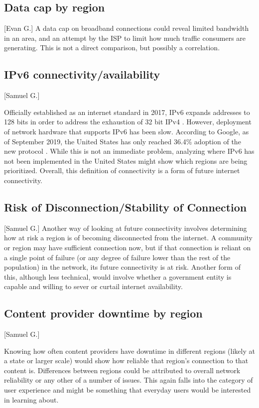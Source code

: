 \subsection{Data cap by region}[Evan G.]
A data cap on broadband connections could reveal limited bandwidth in an area, and an attempt by the ISP to limit how much traffic consumers are generating. This is not a direct comparison, but possibly a correlation.

\subsection{IPv6 connectivity/availability}[Samuel G.]

Officially established as an internet standard in 2017, IPv6 expands \ip addresses to 128 bits in order to address the exhaustion of 32 bit IPv4 \ips. However, deployment of network hardware that supports IPv6 has been slow. According to Google, as of September 2019, the United States has only reached 36.4\% adoption of the new protocol \cite{Google2019a}. While this is not an immediate problem, analyzing where IPv6 has not been implemented in the United States might show which regions are being prioritized. Overall, this definition of connectivity is a form of future internet connectivity.

\subsection{Risk of Disconnection/Stability of Connection}[Samuel G.]
Another way of looking at future connectivity involves determining how at risk a region is of becoming disconnected from the internet. A community or region may have sufficient connection now, but if that connection is reliant on a single point of failure (or any degree of failure lower than the rest of the population) in the network, its future connectivity is at risk. Another form of this, although less technical, would involve whether a government entity is capable and willing to sever or curtail internet availability.

\subsection{Content provider downtime by region}[Samuel G.]

Knowing how often content providers have downtime in different regions (likely at a state or larger scale) would show how reliable that region's connection to that content is. Differences between regions could be attributed to overall network reliability or any other of a number of issues. This again falls into the category of user experience and might be something that everyday users would be interested in learning about.

